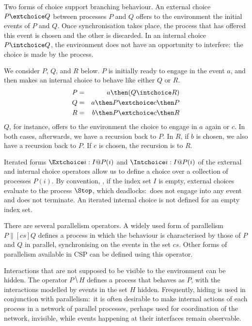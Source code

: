 Two forms of choice support branching behaviour. An external choice $P
\extchoice Q$ between processes $P$ and $Q$ offers to the environment the
initial events of $P$ and $Q$. Once synchronisation takes place, the process
that has offered this event is chosen and the other is discarded. In an
internal choice $P \intchoice Q$, the environment does not have an
opportunity to interfere:~the choice is made by the process.
%
\begin{example}\label{example:CSP}
  We consider $P$, $Q$, and $R$ below. $P$ is initially
  ready to engage in the event $a$, and then makes an internal  choice to
  behave like either $Q$ or $R$.
  \begin{eqnarray*}
  P & = & a \then (Q\intchoice R)
  \\
  Q & = & a \then P \extchoice c \then P
  \\
  R & = & b \then P \extchoice c \then R
  \end{eqnarray*}
  $Q$, for instance, offers to the environment the choice to engage in $a$
  again or $c$. In both cases, afterwards, we have a recursion back to $P$.
  In $R$, if $b$ is chosen, we also have a recursion back to $P$. If $c$ is
  chosen, the recursion is to $R$.
  \xbox
\end{example}
%
Iterated forms $\Extchoice i: I @ P(i)$ and $\Intchoice i: I @ P(i)$ of the
external and internal choice operators allow us to define a choice over a
collection of processes $P(i)$. By convention, , if the index set $I$ is
empty, external choices evaluate to the process $\Stop$, which
deadlocks:~does not engage into any event and does not terminate. An iterated
internal choice is not defined for an empty index set.

There are several parallelism operators. A widely used form of parallelism $P
\parallel[cs] Q$ defines a process in which the behaviour is characterised by
those of $P$ and $Q$ in parallel, synchronising on the events in the set
$cs$. Other forms of parallelism available in CSP can be defined using this
operator.

Interactions that are not supposed to be visible to the environment can be
hidden. The operator $P \hide H$ defines a process that behaves as $P$, with
the interactions modelled by events in the set $H$ hidden. Frequently, hiding
is used in conjunction with parallelism:~it is often desirable to make
internal actions of each process in a network of parallel processes, perhaps
used for coordination of the network, invisible, while events happening at
their interfaces remain observable.

